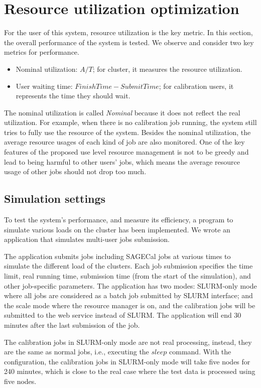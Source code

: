 \section{Resource utilization optimization}
For the user of this system, resource utilization is the key metric.
In this section, the overall performance of the system is tested.
We observe and consider two key metrics for performance.
\begin{itemize}
    \item Nominal utilization: $A/T$; for cluster, it measures the resource utilization.
    \item User waiting time: $FinishTime-SubmitTime$; for calibration users, it represents the time they should wait.
\end{itemize}
The nominal utilization is called \textit{Nominal} because it does not reflect the real utilization.
For example, when there is no calibration job running, the system still tries to fully use the resource of the system.
Besides the nominal utilization, the average resource usages of each kind of job are also monitored.
One of the key features of the proposed use level resource management is not to be greedy and lead to being harmful to other users’ jobs, which means the average resource usage of other jobs should not drop too much.

\subsection{Simulation settings}
To test the system’s performance, and measure its efficiency, a program to simulate various loads on the cluster has been implemented.
We wrote an application that simulates multi-user jobs submission.

The application submits jobs including SAGECal jobs at various times to simulate the different load of the clusters.
Each job submission specifies the time limit, real running time, submission time (from the
start of the simulation), and other job-specific parameters.
The application has two modes: SLURM-only mode where all jobs are considered as a batch job submitted by SLURM interface; and the scale mode where the resource manager is on, and the calibration jobs will be submitted to the web service instead of SLURM.
The application will end 30 minutes after the last submission of the job. 

The calibration jobs in SLURM-only mode are not real processing, instead, they are the same as normal jobs, i.e., executing the $sleep$ command.
With the configuration, the calibration jobs in SLURM-only mode will take five nodes for 240 minutes, which is close to the real case where the test data is processed using five nodes.

